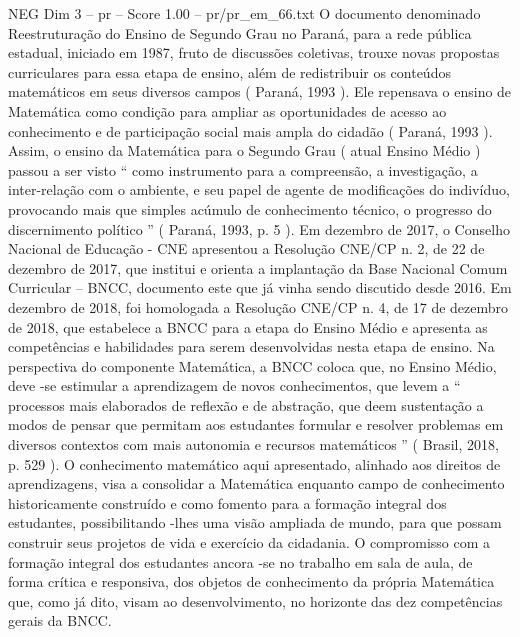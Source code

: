 \begin{textsample}{NEG Dim 3 – pr – Score 1.00 – pr/pr\_em\_66.txt}
O documento denominado Reestruturação do Ensino de Segundo Grau no Paraná, para a rede pública estadual, iniciado em 1987, fruto de discussões coletivas, trouxe novas propostas curriculares para essa etapa de ensino, além de redistribuir os conteúdos matemáticos em seus diversos campos ( Paraná, 1993 ).
Ele repensava o ensino de Matemática como condição para ampliar as oportunidades de acesso ao conhecimento e de participação social mais ampla do cidadão ( Paraná, 1993 ).
Assim, o ensino da Matemática para o Segundo Grau ( atual Ensino Médio ) passou a ser visto “ como instrumento para a compreensão, a investigação, a inter-relação com o ambiente, e seu papel de agente de modificações do indivíduo, provocando mais que simples acúmulo de conhecimento técnico, o progresso do discernimento político ” ( Paraná, 1993, p. 5 ).
Em dezembro de 2017, o Conselho Nacional de Educação - CNE apresentou a Resolução CNE/CP n. 2, de 22 de dezembro de 2017, que institui e orienta a implantação da Base Nacional Comum Curricular – BNCC, documento este que já vinha sendo discutido desde 2016.
Em dezembro de 2018, foi homologada a Resolução CNE/CP n. 4, de 17 de dezembro de 2018, que estabelece a BNCC para a etapa do Ensino Médio e apresenta as competências e habilidades para serem desenvolvidas nesta etapa de ensino.
Na perspectiva do componente Matemática, a BNCC coloca que, no Ensino Médio, deve -se estimular a aprendizagem de novos conhecimentos, que levem a “ processos mais elaborados de reflexão e de abstração, que deem sustentação a modos de pensar que permitam aos estudantes formular e resolver problemas em diversos contextos com mais autonomia e recursos matemáticos ” ( Brasil, 2018, p. 529 ).
O conhecimento matemático aqui apresentado, alinhado aos direitos de aprendizagens, visa a consolidar a Matemática enquanto campo de conhecimento historicamente construído e como fomento para a formação integral dos estudantes, possibilitando -lhes uma visão ampliada de mundo, para que possam construir seus projetos de vida e exercício da cidadania.
O compromisso com a formação integral dos estudantes ancora -se no trabalho em sala de aula, de forma crítica e responsiva, dos objetos de conhecimento da própria Matemática que, como já dito, visam ao desenvolvimento, no horizonte das dez competências gerais da BNCC.

\end{textsample}
